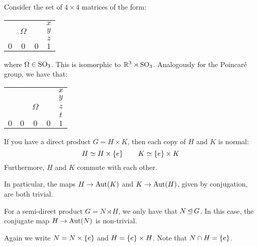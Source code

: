 \begin{xmp}[source=Primary Source Material]
    Consider the set of $ 4 \times 4 $ matrices of the form:
    \begin{center}
        \begin{tabular}{ccc|c}
            $  $ & $  $ & $  $ & $ x $ \\
            $  $ & $ \Omega $ & $  $ & $ y $ \\
            $  $ & $  $ & $  $ & $ z $ \\
            \hline
            $ 0 $ & $ 0 $ & $ 0 $ & $ 1 $
        \end{tabular}
    \end{center}
    where $ \Omega \in \operatorname{SO}_{3} $. This is isomorphic to $ \mathbb{R}^{3} \rtimes \operatorname{SO}_{3} $. \vsp
    Analogously for the Poincar\'e group, we have that:
    \begin{center}
        \begin{tabular}{cccc|c}
            $  $ & $  $ & $  $ & $  $ & $ x $ \\
            $  $ & $  $ & $  $ & $  $ & $ y $ \\
            $  $ & $  $ & $ \Omega $ & $  $ & $ z $ \\
            $  $ & $  $ & $  $ & $  $ & $ t $ \\
            \hline
            $ 0 $ & $ 0 $ & $ 0 $ & $ 0 $ & $ 1 $
        \end{tabular}
    \end{center}
\end{xmp}


If you have a direct product $ G = H \times K $,
then each copy of $ H $ and $ K $ is normal:
\begin{equation*}
    H \simeq H \times \left\{{e}\right\} \qquad K \simeq \left\{{e}\right\} \times K
\end{equation*}
Furthermore, $ H $ and $ K $ commute with each other.

In particular, the maps $ H \rightarrow \operatorname{Aut}(K) $ and $ K \rightarrow \operatorname{Aut}(H) $,
given by conjugation, are both trivial.

For a semi-direct product $ G = N \rtimes H $, we only have that $ N \operatorname{\trianglelefteq} G $.
In this case, the conjugate map $ H \rightarrow \operatorname{Aut}(N) $ is non-trivial.

Again we write $ N = N \times \left\{{e}\right\} $ and $ H = \left\{{e}\right\} \times H $.
Note that $ N \cap H = \left\{{e}\right\} $.

